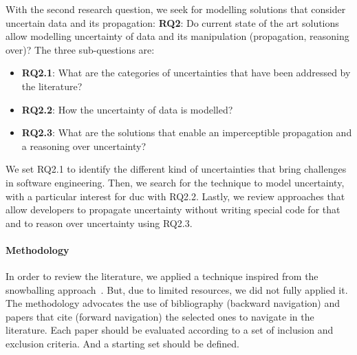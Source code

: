 With the second research question, we seek for modelling solutions that consider uncertain data and its propagation: \textbf{RQ2}: Do current state of the art solutions allow modelling uncertainty of data and its manipulation (propagation, reasoning over)?
The three sub-questions are:
\begin{itemize}
	\item \textbf{RQ2.1}: What are the categories of uncertainties that have been addressed by the literature?
	\item \textbf{RQ2.2}: How the uncertainty of data is modelled?
	\item \textbf{RQ2.3}: What are the solutions that enable an imperceptible propagation and a reasoning over uncertainty?
\end{itemize}
We set RQ2.1 to identify the different kind of uncertainties that bring challenges in software engineering.
Then, we search for the technique to model uncertainty, with a particular interest for \gls{duc} with RQ2.2.
Lastly, we review approaches that allow developers to propagate uncertainty without writing special code for that and to reason over uncertainty using RQ2.3.

\paragraph{Methodology}
In order to review the literature, we applied a technique inspired from the snowballing approach~\cite{DBLP:conf/ease/Wohlin14}.
But, due to limited resources, we did not fully applied it.
The methodology advocates the use of bibliography (backward navigation) and papers that cite (forward navigation) the selected ones to navigate in the literature.
Each paper should be evaluated according to a set of inclusion and exclusion criteria.
And a starting set should be defined.

